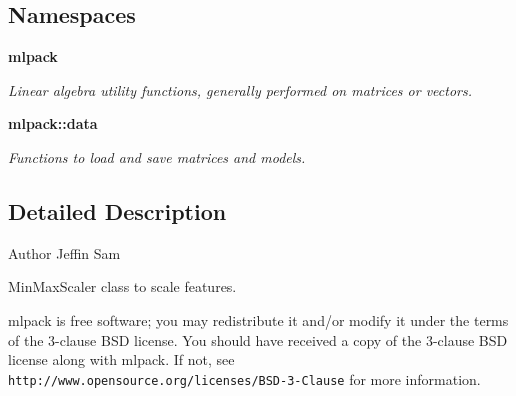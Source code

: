 \subsection*{Namespaces}
\begin{DoxyCompactItemize}
\item 
 \textbf{ mlpack}
\begin{DoxyCompactList}\small\item\em Linear algebra utility functions, generally performed on matrices or vectors. \end{DoxyCompactList}\item 
 \textbf{ mlpack\+::data}
\begin{DoxyCompactList}\small\item\em Functions to load and save matrices and models. \end{DoxyCompactList}\end{DoxyCompactItemize}


\subsection{Detailed Description}
\begin{DoxyAuthor}{Author}
Jeffin Sam
\end{DoxyAuthor}
Min\+Max\+Scaler class to scale features.

mlpack is free software; you may redistribute it and/or modify it under the terms of the 3-\/clause B\+SD license. You should have received a copy of the 3-\/clause B\+SD license along with mlpack. If not, see {\tt http\+://www.\+opensource.\+org/licenses/\+B\+S\+D-\/3-\/\+Clause} for more information. 